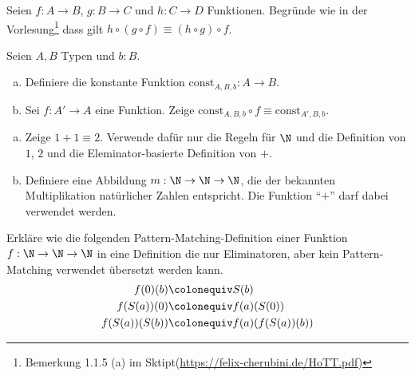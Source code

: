 \documentclass{hott-übung}
\begin{document}
\setcounter{blattnummer}{1}
\setcounter{aufgabennummer}{0}

\blatt

  Seien $f:A\to B$, $g:B\to C$ und $h:C\to D$ Funktionen.
  Begründe wie in der Vorlesung\footnote{Bemerkung 1.1.5 (a) im Sktipt(\url{https://felix-cherubini.de/HoTT.pdf})} dass gilt $h\circ(g\circ f)\equiv (h\circ g)\circ f$.

  Seien $A,B$ Typen und $b:B$.
  \begin{enumerate}[(a)]
    \item Definiere die konstante Funktion $\mathrm{const}_{A,B,b}:A\to B$.
    \item Sei $f:A'\to A$ eine Funktion.
      Zeige $\mathrm{const}_{A,B,b}\circ f \equiv \mathrm{const}_{A',B,b}$.
  \end{enumerate}

\aufgabe{}
\begin{enumerate}[(a)]
\item Zeige $1+1\equiv 2$. Verwende dafür nur die Regeln für $\N$ und die Definition von $1$, $2$ und die Eleminator-basierte Definition von $+$.
\item Definiere eine Abbildung $m:\N\to\N\to\N$, die der bekannten Multiplikation natürlicher Zahlen entspricht. Die Funktion ``$+$'' darf dabei verwendet werden.
\end{enumerate}
  
  Erkläre wie die folgenden Pattern-Matching-Definition einer Funktion $f:\N\to\N\to\N$ in eine
  Definition die nur Eliminatoren, aber kein Pattern-Matching verwendet übersetzt werden kann.
  \begin{align*}
    f(0)(b) &\colonequiv S(b) \\
    f(S(a))(0) &\colonequiv f(a)(S(0)) \\
    f(S(a))(S(b)) &\colonequiv f(a)(f(S(a))(b))
  \end{align*}
\end{document}
